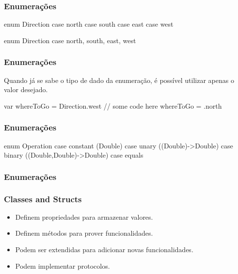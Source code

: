 \begin{frame}[fragile]
    \frametitle{Enumerações}

    \begin{swift}
        enum Direction {
            case north
            case south
            case east
            case west
        }

        enum Direction {
            case north, south, east, west
        }
    \end{swift}
\end{frame}

\begin{frame}[fragile]
    \frametitle{Enumerações}

    Quando já se sabe o tipo de dado da enumeração, é possível
    utilizar apenas o valor desejado.
    \vspace{0.5cm}
    \begin{swift}
        var whereToGo = Direction.west
        // some code here
        whereToGo = .north
    \end{swift}
\end{frame}

\begin{frame}[fragile]
    \frametitle{Enumerações}

    \begin{swift}
        enum Operation {
            case constant (Double)
            case unary ((Double)->Double)
            case binary ((Double,Double)->Double)
            case equals
        }
    \end{swift}
\end{frame}

\begin{frame}[fragile]
    \frametitle{Enumerações}

\end{frame}

\begin{frame}[fragile]
    \frametitle{Classes and Structs}

    \begin{itemize}
        \item Definem propriedades para armazenar valores.
        \item Definem métodos para prover funcionalidades.
        \item Podem ser extendidas para adicionar novas funcionalidades.
        \item Podem implementar protocolos.
    \end{itemize}
\end{frame}

